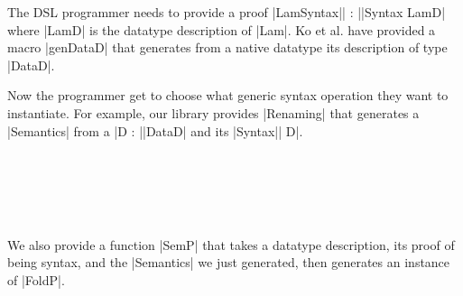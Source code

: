 \documentclass[sigplan,review,fleqn]{acmart}
\renewcommand{\verb}{\collectverb{\color{AgdaFunction}}}
\newcommand{\macro}{\collectverb{\color{AgdaMacro}}}
\newcommand{\name}{\collectverb{\it}}
\begin{document}
The DSL programmer needs to provide a proof \verb|LamSyntax|\name| : |\verb|Syntax LamD| where \verb|LamD| is the datatype description of \verb|Lam|. 
Ko et al. have provided a macro \macro|genDataD| that generates from a native datatype its description of type \verb|DataD|.
\begin{code}
	\>[0]\AgdaSpace{}%
	\AgdaSymbol{=}\AgdaSpace{}%
	\AgdaSpace{}%
	\<%
\end{code}
Now the programmer get to choose what generic syntax operation they want to instantiate.
For example, our library provides \verb|Renaming| that generates a \verb|Semantics| from a \name|D : |\verb|DataD| and its \verb|Syntax|\name| D|. 
\begin{code}
	\>[2]%
	\>[296I]\AgdaSymbol{:}\AgdaSpace{}%
	\AgdaSymbol{(}\AgdaSpace{}%
	\AgdaSymbol{:}\AgdaSpace{}%
	\AgdaSymbol{)}\<%
	\\
	\>[.][@{}l@{}]\<[296I]%
	\>[11]\AgdaSpace{}%
	\AgdaSymbol{(}\AgdaSpace{}%
	\AgdaSymbol{:}\AgdaSpace{}%
	\AgdaSpace{}%
	\AgdaSymbol{)}\<%
	\\
	\>[11]\AgdaSpace{}%
	\AgdaSpace{}%
	\AgdaSpace{}%
	\AgdaSpace{}%
	\AgdaSpace{}%
	\<%
	\\
	\\[\AgdaEmptyExtraSkip]%
	\>[0]\AgdaSpace{}%
	\AgdaSymbol{=}\AgdaSpace{}%
	\AgdaSpace{}%
	\AgdaSpace{}%
	\<%
\end{code}
We also provide a function \verb|SemP| that takes a datatype description, its proof of being syntax, and the \verb|Semantics| we just generated, then generates an instance of \verb|FoldP|.
\end{document}
